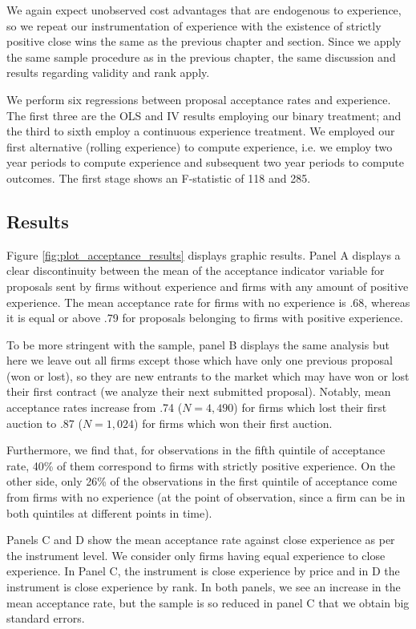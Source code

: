 We again expect  unobserved cost advantages that are endogenous to experience, so we repeat our instrumentation of experience with the existence of strictly positive close wins the same as the previous chapter and section. Since we apply the same sample procedure as in the previous chapter, the same discussion and results regarding validity and rank apply.

We perform six regressions between proposal acceptance rates and experience. The first three are the OLS and IV results employing our binary treatment; and the third to sixth employ a continuous experience treatment. We employed our first alternative (rolling experience) to compute experience, i.e. we employ two year periods to compute experience and subsequent two year periods to compute outcomes. The first stage shows an F-statistic of 118 and 285.

\subsection{Results}
Figure \ref{fig:plot_acceptance_results} displays graphic results. Panel A displays a clear discontinuity between the mean of the acceptance indicator variable for proposals sent by firms without experience and firms with any amount of positive experience. The mean acceptance rate for firms with no experience is .68, whereas it is equal or above .79 for proposals belonging to firms with positive experience.

To be more stringent with the sample, panel B displays the same analysis but here we leave out all firms except those which have only one previous proposal (won or lost), so they are new entrants to the market which may have won or lost their first contract (we analyze their next submitted proposal).  Notably, mean acceptance rates increase from .74 ($N=4,490$) for firms which lost their first auction to .87 ($N=1,024$) for firms which won their first auction.

Furthermore, we find that, for observations in the fifth quintile of acceptance rate, 40\% of them correspond to firms with strictly positive experience. On the other side, only 26\% of the observations in the first quintile of acceptance come from firms with no experience (at the point of observation, since a firm can be in both quintiles at different points in time).

Panels C and D show the mean acceptance rate against close experience as per the instrument level. We consider only firms having equal experience to close experience. In Panel C, the instrument is close experience by price and in D the instrument is close experience by rank. In both panels, we see an increase in the mean acceptance rate, but the sample is so reduced in panel C that we obtain big standard errors.

